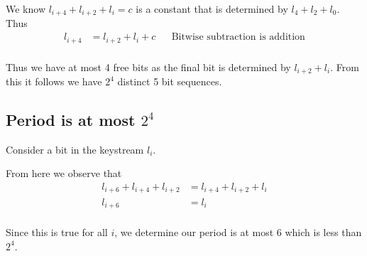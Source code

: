 \documentclass{article}
\begin{document}
We know $l_{i+4} + l_{i+2} + l_{i} = c$ is a constant that is determined by
$l_{4} + l_{2} + l_{0}$. Thus
\begin{align*}
    l_{i+4} &= l_{i+2} + l_{i} + c && \text{Bitwise subtraction is addition} \\
\end{align*}

Thus we have at most 4 free bits as the final bit is determined by
$l_{i+2} + l_{i}$. From this it follows we have $2^4$ distinct 5 bit sequences.

\subsection{Period is at most $2^4$}
Consider a bit in the keystream $l_i$.

From here we observe that
\begin{align*}
    l_{i+6} + l_{i+4} + l_{i+2} &= l_{i+4} + l_{i+2} + l_{i} \\
    l_{i+6} &= l_{i} \\
\end{align*}

Since this is true for all $i$, we determine our period is at most 6 which
is less than $2^4$.
\end{document}
